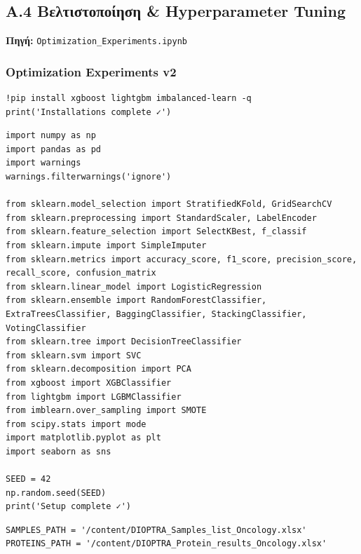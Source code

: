 \subsection{A.4 Βελτιστοποίηση \& Hyperparameter Tuning}
 
\noindent \textbf{Πηγή:} \texttt{Optimization\_Experiments.ipynb}
 
 
\subsubsection*{Optimization Experiments v2}
 
\begin{lstlisting}
!pip install xgboost lightgbm imbalanced-learn -q
print('Installations complete ✓')
\end{lstlisting}
 
\begin{lstlisting}
import numpy as np
import pandas as pd
import warnings
warnings.filterwarnings('ignore')
 
from sklearn.model_selection import StratifiedKFold, GridSearchCV
from sklearn.preprocessing import StandardScaler, LabelEncoder
from sklearn.feature_selection import SelectKBest, f_classif
from sklearn.impute import SimpleImputer
from sklearn.metrics import accuracy_score, f1_score, precision_score, recall_score, confusion_matrix
from sklearn.linear_model import LogisticRegression
from sklearn.ensemble import RandomForestClassifier, ExtraTreesClassifier, BaggingClassifier, StackingClassifier, VotingClassifier
from sklearn.tree import DecisionTreeClassifier
from sklearn.svm import SVC
from sklearn.decomposition import PCA
from xgboost import XGBClassifier
from lightgbm import LGBMClassifier
from imblearn.over_sampling import SMOTE
from scipy.stats import mode
import matplotlib.pyplot as plt
import seaborn as sns
 
SEED = 42
np.random.seed(SEED)
print('Setup complete ✓')
\end{lstlisting}
 
\begin{lstlisting}
SAMPLES_PATH = '/content/DIOPTRA_Samples_list_Oncology.xlsx'
PROTEINS_PATH = '/content/DIOPTRA_Protein_results_Oncology.xlsx'
\end{lstlisting}
 
